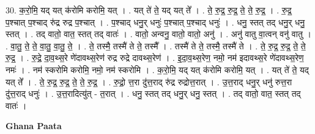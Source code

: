 \documentclass[17pt]{extarticle}
\begin{document}
30. क॒रो॒मि॒ यद् यत् क॑रोमि करोमि॒ यत् । . यत् ते॑ ते॒ यद् यत् ते᳚ । . ते॒ रु॒द्र॒ रु॒द्र॒ ते॒ ते॒ रु॒द्र॒ । . रु॒द्र॒ प॒श्चात् प॒श्चाद् रु॑द्र रुद्र प॒श्चात् । . प॒श्चाद् धनु॒र् धनुः॑ प॒श्चात् प॒श्चाद् धनुः॑ । . धनु॒ स्तत् तद् धनु॒र् धनु॒ स्तत् । . तद् वातो॒ वात॒ स्तत् तद् वातः॑ । . वातो॒ अन्वनु॒ वातो॒ वातो॒ अनु॑ । . अनु॑ वातु वा॒त्वन् वनु॑ वातु । . वा॒तु॒ ते॒ ते॒ वा॒तु॒ वा॒तु॒ ते॒ । . ते॒ तस्मै॒ तस्मै॑ ते ते॒ तस्मै᳚ । . तस्मै॑ ते ते॒ तस्मै॒ तस्मै॑ ते । . ते॒ रु॒द्र॒ रु॒द्र॒ ते॒ ते॒ रु॒द्र॒ । . रु॒द्रे॒ दा॒व॒थ्स॒रे णे॑दावथ्स॒रेण॑ रुद्र रुद्रे दावथ्स॒रेण॑ । . इ॒दा॒व॒थ्स॒रेण॒ नमो॒ नम॑ इदावथ्स॒रे णे॑दावथ्स॒रेण॒ नमः॑ । . नम॑ स्करोमि करोमि॒ नमो॒ नम॑ स्करोमि । . क॒रो॒मि॒ यद् यत् क॑रोमि करोमि॒ यत् । . यत् ते॑ ते॒ यद् यत् ते᳚ । . ते॒ रु॒द्र॒ रु॒द्र॒ ते॒ ते॒ रु॒द्र॒ । . रु॒द्रो॒ त्त॒रा दु॑त्त॒राद् रु॑द्र रुद्रोत्त॒रात् । . उ॒त्त॒राद् धनु॒र् धनु॑ रुत्त॒रा दु॑त्त॒राद् धनुः॑ । . उ॒त्त॒रादित्यु॑त् - त॒रात् । . धनु॒ स्तत् तद् धनु॒र् धनु॒ स्तत् । . तद् वातो॒ वात॒ स्तत् तद् वातः॑ । \newline

\textbf{Ghana Paata } \newline
\end{document}
